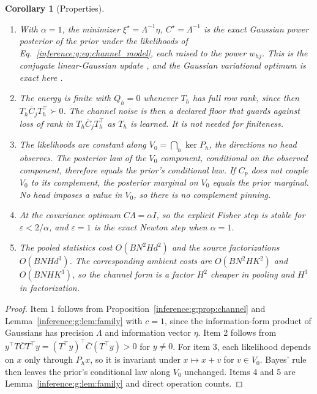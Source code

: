 \documentclass[11pt]{article}
\newtheorem{corollary}[theorem]{Corollary}
\theoremstyle{definition}
\theoremstyle{remark}
\begin{document}
\begin{corollary}[Properties]
\label{inference:g:cor:channel}
\begin{enumerate}
\item With $\alpha=1$, the minimizer $\xi^\star=\Lambda^{-1}\eta$, $C^\star=\Lambda^{-1}$ is the exact Gaussian power posterior of the prior under the likelihoods of Eq.~\eqref{inference:g:eq:channel_model}, each raised to the power $w_{hj}$. This is the conjugate linear-Gaussian update \citep[Sec.~2.3.3]{inference:bishop2006}, and the Gaussian variational optimum is exact here \citep{inference:opper2009variational}.
\item The energy is finite with $Q_h=0$ whenever $T_h$ has full row rank, since then $T_h\bar C_jT_h^\top\succ0$. The channel noise is then a declared floor that guards against loss of rank in $T_h\bar C_jT_h^\top$ as $T_h$ is learned. It is not needed for finiteness.
\item The likelihoods are constant along $V_0=\bigcap_h\ker P_h$, the directions no head observes. The posterior law of the $V_0$ component, conditional on the observed component, therefore equals the prior's conditional law. If $C_p$ does not couple $V_0$ to its complement, the posterior marginal on $V_0$ equals the prior marginal. No head imposes a value in $V_0$, so there is no complement pinning.
\item At the covariance optimum $C\Lambda=\alpha I$, so the explicit Fisher step is stable for $\varepsilon<2/\alpha$, and $\varepsilon=1$ is the exact Newton step when $\alpha=1$.
\item The pooled statistics cost $O(BN^2Hd^2)$ and the source factorizations $O(BNHd^3)$. The corresponding ambient costs are $O(BN^2HK^2)$ and $O(BNHK^3)$, so the channel form is a factor $H^2$ cheaper in pooling and $H^3$ in factorization.
\end{enumerate}
\end{corollary}

\begin{proof}
Item 1 follows from Proposition~\ref{inference:g:prop:channel} and Lemma~\ref{inference:g:lem:family} with $c=1$, since the information-form product of Gaussians has precision $\Lambda$ and information vector $\eta$. Item 2 follows from $y^\top T\bar CT^\top y=(T^\top y)^\top\bar C(T^\top y)>0$ for $y\ne0$. For item 3, each likelihood depends on $x$ only through $P_hx$, so it is invariant under $x\mapsto x+v$ for $v\in V_0$. Bayes' rule then leaves the prior's conditional law along $V_0$ unchanged. Items 4 and 5 are Lemma~\ref{inference:g:lem:family} and direct operation counts.
\end{proof}
\end{document}
